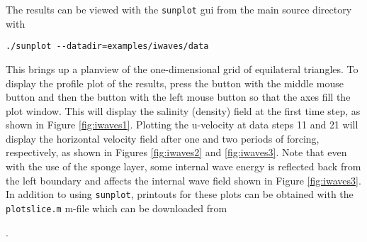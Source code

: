 The results can be viewed with the \verb+sunplot+ gui from the main source directory with
\begin{verbatim}
./sunplot --datadir=examples/iwaves/data
\end{verbatim}
This brings up a planview of the one-dimensional grid of equilateral triangles.  To display
the profile plot of the results, press the  button with the middle mouse
button and then the  button with the left mouse button so that the axes fill the plot window.
This will display the salinity (density) field at the first time step, as shown in Figure 
\ref{fig:iwaves1}.  Plotting the u-velocity at data steps 11 and 21 will display the horizontal
velocity field after one and two periods of forcing, respectively, as shown in Figures 
\ref{fig:iwaves2} and \ref{fig:iwaves3}.  Note that even with the use of the sponge layer,
some internal wave energy is reflected back from the left boundary and affects the internal
wave field shown in Figure \ref{fig:iwaves3}.  In addition to using \verb+sunplot+, printouts for
these  plots can be obtained with the 
\verb+plotslice.m+ m-file which can be downloaded from 

\medskip
\noindent
\mfiledownload.

\medskip
\noindent
{}


